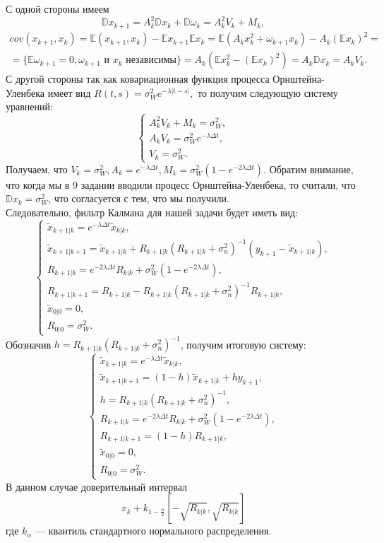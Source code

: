 \documentclass[11pt]{article}
\begin{document}
С одной стороны имеем
\[ \mathbb{D}x_{k+1} = A_k^2\mathbb{D}x_k + \mathbb{D}\omega_k = A_k^2 V_k + M_k, \]
\begin{eqnarray*}
cov(x_{k+1},x_k) = \mathbb{E}(x_{k+1},x_k) - \mathbb{E}x_{k+1}\mathbb{E}x_k = \mathbb{E}(A_kx_k^2 + \omega_{k+1}x_k) - A_k(\mathbb{E}x_k)^2 = \\
= \{\mathbb{E}\omega_{k+1} = 0, \omega_{k+1} \text{ и } x_k \text{ независимы} \} = A_k(\mathbb{E}x_k^2 - (\mathbb{E}x_k)^2) = A_k\mathbb{D}x_k = A_kV_k.
\end{eqnarray*}
С другой стороны так как ковариационная функция процесса Орнштейна-Уленбека имеет вид $R(t,s)= \sigma^2_W e^{-\lambda|t-s|},$ то получим следующую систему уравнений:
\[ 
\begin{cases}
A^2_kV_k + M_k = \sigma^2_W,\\
A_kV_k = \sigma^2_We^{-\lambda\Delta t},\\
V_k = \sigma_W^2.
\end{cases}
\]
Получаем, что $V_k = \sigma_W^2, A_k = e^{-\lambda\Delta t},M_k = \sigma^2_W(1 - e^{-2\lambda\Delta t}).$ Обратим внимание, что когда мы в 9 задании вводили процесс Орнштейна-Уленбека, то считали, что $\mathbb{D}x_k = \sigma_W^2$, что согласуется с тем, что мы получили.\\
Следовательно, фильтр Калмана для нашей задачи будет иметь вид:
\[  
\begin{cases}
\tilde{x}_{k+1|k} = e^{-\lambda\Delta t}\tilde{x}_{k|k},\\
\tilde{x}_{k+1|k+1} = \tilde{x}_{k+1|k} + R_{k+1|k}(R_{k+1|k} + \sigma_n^2)^{-1}(y_{k+1} - \tilde{x}_{k+1|k}),\\
R_{k+1|k} = e^{-2\lambda \Delta t} R_{k|k} + \sigma^2_W(1 - e^{-2\lambda \Delta t}),\\
R_{k+1|k+1} = R_{k+1|k} - R_{k+1|k}(R_{k+1|k} + \sigma^2_n)^{-1}R_{k+1|k},\\
\tilde{x}_{0|0} = 0,\\
R_{0|0} = \sigma_W^2.
\end{cases}
\] 
Обозначив $h = R_{k+1|k}(R_{k+1|k} + \sigma^2_n)^{-1}$, получим итоговую систему:
\[  
\begin{cases}
\tilde{x}_{k+1|k} = e^{-\lambda\Delta t}\tilde{x}_{k|k},\\
\tilde{x}_{k+1|k+1} = (1 - h)\tilde{x}_{k+1|k} + hy_{k+1},\\
h =  R_{k+1|k}(R_{k+1|k} + \sigma^2_n)^{-1}, \\
R_{k+1|k} = e^{-2\lambda \Delta t} R_{k|k} + \sigma^2_W(1 - e^{-2\lambda \Delta t}),\\
R_{k+1|k+1} = (1 - h)R_{k+1|k},\\
\tilde{x}_{0|0} = 0,\\
R_{0|0} = \sigma_W^2.
\end{cases}
\]
В данном случае доверительный интервал
\[x_k + k_{1- \frac{\alpha}{2}}[-\sqrt{R_{k|k}},\sqrt{R_{k|k}}]\]
где $k_\alpha$ --- квантиль стандартного нормального распределения.
\end{document}
